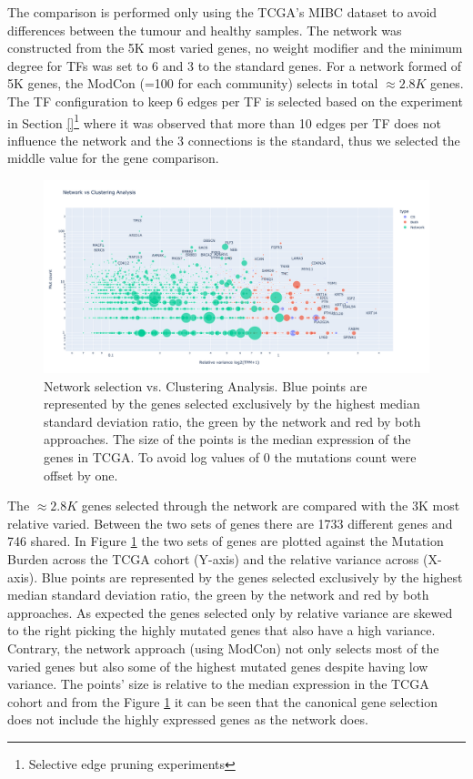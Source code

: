 The comparison is performed only using the TCGA's MIBC dataset to avoid differences between the tumour and healthy samples. The network was constructed from the 5K most varied genes, no weight modifier and the minimum degree for TFs  was set to 6 and 3 to the standard genes. For a network formed of 5K genes, the ModCon (=100 for each community) selects in total $\approx2.8K$ genes. The TF configuration to keep 6 edges per TF is selected based on the experiment in Section \ref{}\footnote{Selective edge pruning experiments} where it was observed that more than 10 edges per TF does not influence the network and the 3 connections is the standard, thus we selected the middle value for the gene comparison.


\begin{figure}[!htb]    \centering\includegraphics[width=1.0\textwidth,height=0.7\textheight,keepaspectratio]{Sections/Network_I/Resources/Tum_network/ClusteringAnalysis_vs_Network_3.png}
    \caption{Network selection vs. Clustering Analysis. Blue points are represented by the genes selected exclusively by the highest median standard deviation ratio, the green by the network and red by both approaches. The size of the points is the median expression of the genes in TCGA. To avoid log values of 0 the mutations count were offset by one.}
    \label{fig:N_I:network_ca_selection}
\end{figure}


The $\approx2.8K$ genes selected through the network are compared with the 3K most relative varied. Between the two sets of genes there are 1733 different genes and 746 shared. In Figure \ref{fig:N_I:network_ca_selection} the two sets of genes are plotted against the Mutation Burden across the TCGA cohort (Y-axis) and the relative variance across (X-axis). Blue points are represented by the genes selected exclusively by the highest median standard deviation ratio, the green by the network and red by both approaches. As expected the genes selected only by relative variance are skewed to the right picking the highly mutated genes that also have a high variance. Contrary, the network approach (using ModCon) not only selects most of the varied genes but also some of the highest mutated genes despite having low variance. The points' size is relative to the median expression in the TCGA cohort and from the Figure \ref{fig:N_I:network_ca_selection} it can be seen that the canonical gene selection does not include the highly expressed genes as the network does.

